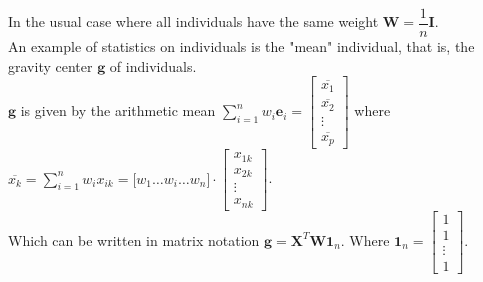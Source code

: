 \begin{notechapter}
In the usual case where all individuals have the same weight $\mathbf{W} = \dfrac{1}{n}\mathbf{I}$.\\[5pt]
%
An example of statistics on individuals is the "mean" individual, that is, the gravity center $\mathbf{g}$ of individuals.\\[5pt]
%
$\mathbf{g}$ is given by the arithmetic mean $\displaystyle\sum\limits_{i=1}^{n}w_i\mathbf{e}_{i} = 
\begin{bmatrix*}\overline{x_{1}}\\\overline{x_{2}}\\ \vdots \\\overline{x_{p}} \end{bmatrix*}
$ where $\overline{x_{k}} = \displaystyle\sum\limits_{i=1}^{n}w_{i}x_{ik} = 
\big[ w_1 \dots w_i \dots w_n \big] \cdot \begin{bmatrix*}{x_{{1}{k}}}\\{x_{{2}{k}}}\\ \vdots \\{x_{{n}{k}}} \end{bmatrix*}
$.\\[6pt]
%
Which can be written in matrix notation $\mathbf{g} = \mathbf{X}^{T}\mathbf{W}\mathbf{1}_{n}$. 
Where $\mathbf{1}_{n} = \begin{bmatrix*}1\\1\\ \vdots \\1 \end{bmatrix*}$.
%
%

\end{notechapter}
